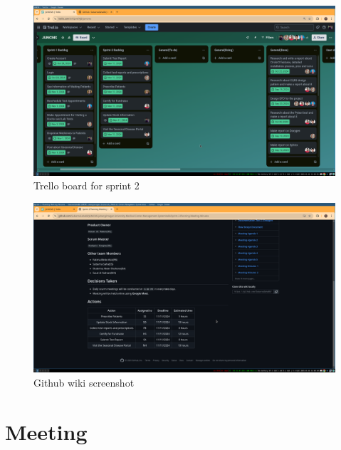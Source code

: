 \documentclass[a4paper,12pt]{article}
\begin{document}
\begin{figure}[H]
    \centering
    \includegraphics[width=1\textwidth]{images/spr2plan2.png}   
    \caption{Trello board for sprint 2}
    \label{fig:spr2plan2}
\end{figure}
\begin{figure}[H]
    \centering
    \includegraphics[width=1\textwidth]{images/spr2plan3.png}   
    \caption{Github wiki screenshot}
    \label{fig:spr2plan3}
\end{figure}
\newpage
\section{Meeting}
\end{document}
